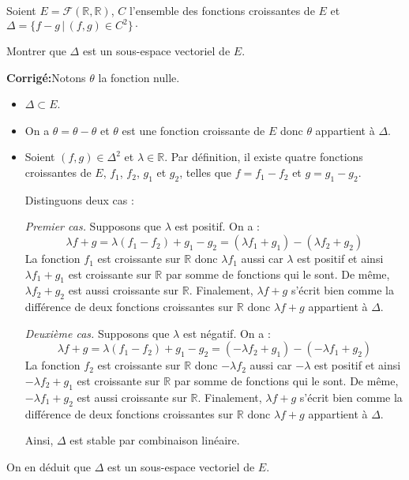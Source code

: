 \documentclass[a4paper,twoside,french,10pt]{VcCours}
\newcommand{\corr}{\textbf{Corrigé:}}
\begin{document}
\medskip

\begin{Exercice}{} Soient $E = \mathcal{F}(\mathbb{R}, \mathbb{R})$, $C$ l'ensemble des fonctions croissantes de $E$ et $\Delta = \lbrace f-g \, \vert \, (f,g) \in C^2 \rbrace\cdot$

Montrer que $\Delta$ est un sous-espace vectoriel de $E$.
\end{Exercice}

\corr Notons $\theta$ la fonction nulle.

\begin{itemize}
\item $\Delta \subset E$.
\item On a $\theta = \theta - \theta$ et $\theta$ est une fonction croissante de $E$ donc $\theta$ appartient à $\Delta$.
\item Soient $(f,g) \in \Delta^2$ et $\lambda \in \mathbb{R}$. Par définition, il existe quatre fonctions croissantes de $E$, $f_1$, $f_2$, $g_1$ et $g_2$, telles que $f=f_1- f_2$ et $g= g_1-g_2$.

\medskip

Distinguons deux cas :

\textit{Premier cas.} Supposons que $\lambda$ est positif. On a :
$$ \lambda f+g = \lambda (f_1-f_2) + g_1- g_2 = (\lambda f_1 + g_1) - (\lambda f_2+g_2)$$
La fonction $f_1$ est croissante sur $\mathbb{R}$ donc $\lambda f_1$ aussi car $\lambda$ est positif et ainsi $\lambda f_1 + g_1$ est croissante sur $\mathbb{R}$ par somme de fonctions qui le sont. De même, $\lambda f_2+g_2$ est aussi croissante sur $\mathbb{R}$. Finalement, $\lambda f+g$ s'écrit bien comme la différence de deux fonctions croissantes sur $\mathbb{R}$ donc $\lambda f+g$ appartient à $\Delta$.

\medskip

\textit{Deuxième cas.} Supposons que $\lambda$ est négatif. On a :
$$ \lambda f+g = \lambda (f_1-f_2) + g_1- g_2 = (-\lambda f_2 + g_1) - (-\lambda f_1+g_2)$$
La fonction $f_2$ est croissante sur $\mathbb{R}$ donc $-\lambda f_2$ aussi car $-\lambda$ est positif et ainsi $-\lambda f_2 + g_1$ est croissante sur $\mathbb{R}$ par somme de fonctions qui le sont. De même, $-\lambda f_1+g_2$ est aussi croissante sur $\mathbb{R}$. Finalement, $\lambda f+g$ s'écrit bien comme la différence de deux fonctions croissantes sur $\mathbb{R}$ donc $\lambda f+g$ appartient à $\Delta$.

\medskip

Ainsi, $\Delta$ est stable par combinaison linéaire.
\end{itemize}
On en déduit que $\Delta$ est un sous-espace vectoriel de $E$.
\end{document}
